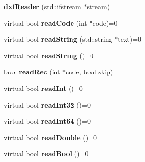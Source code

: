 \begin{DoxyCompactItemize}
\item 
\hypertarget{classdxfReader_a78723af9ca382b49222fd310b541a552}{{\bfseries dxf\-Reader} (std\-::ifstream $\ast$stream)}\label{classdxfReader_a78723af9ca382b49222fd310b541a552}

\item 
\hypertarget{classdxfReader_afeca6509bc2c9bd366642ed28fefc7c0}{virtual bool {\bfseries read\-Code} (int $\ast$code)=0}\label{classdxfReader_afeca6509bc2c9bd366642ed28fefc7c0}

\item 
\hypertarget{classdxfReader_abc3a1aec30acb5188405bd398be954ce}{virtual bool {\bfseries read\-String} (std\-::string $\ast$text)=0}\label{classdxfReader_abc3a1aec30acb5188405bd398be954ce}

\item 
\hypertarget{classdxfReader_a41ffcc9dfb0fa09593f8216ba1e458a0}{virtual bool {\bfseries read\-String} ()=0}\label{classdxfReader_a41ffcc9dfb0fa09593f8216ba1e458a0}

\item 
\hypertarget{classdxfReader_a8d1ee916da16a091a321ab82e2001f7a}{bool {\bfseries read\-Rec} (int $\ast$code, bool skip)}\label{classdxfReader_a8d1ee916da16a091a321ab82e2001f7a}

\item 
\hypertarget{classdxfReader_a17249246fb21da0f6b29fd2921862377}{virtual bool {\bfseries read\-Int} ()=0}\label{classdxfReader_a17249246fb21da0f6b29fd2921862377}

\item 
\hypertarget{classdxfReader_a37fcc22ce96d9d15199708fb565fdf57}{virtual bool {\bfseries read\-Int32} ()=0}\label{classdxfReader_a37fcc22ce96d9d15199708fb565fdf57}

\item 
\hypertarget{classdxfReader_a1d82b232678b65ee146d977f7eb0131e}{virtual bool {\bfseries read\-Int64} ()=0}\label{classdxfReader_a1d82b232678b65ee146d977f7eb0131e}

\item 
\hypertarget{classdxfReader_a5f45136af9496e46c99961069d69c8ab}{virtual bool {\bfseries read\-Double} ()=0}\label{classdxfReader_a5f45136af9496e46c99961069d69c8ab}

\item 
\hypertarget{classdxfReader_a30dc9ed2033e0001383e5f19ffbad971}{virtual bool {\bfseries read\-Bool} ()=0}\label{classdxfReader_a30dc9ed2033e0001383e5f19ffbad971}


\end{DoxyCompactItemize}
